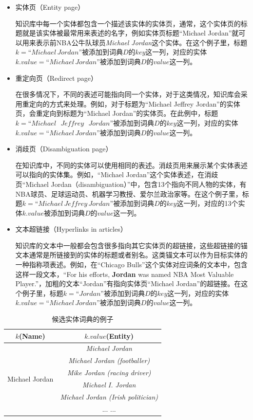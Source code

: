 \begin{itemize}
	\item {实体页（Entity page）
		
		知识库中每一个实体都包含一个描述该实体的实体页，通常，这个实体页的标题就是该实体被最常用来表述的名字，例如实体页标题“Michael Jordan”就可以用来表示前NBA公牛队球员\textit{Michael Jordan}这个实体。在这个例子里，标题$k=“Michael\, Jordan”$被添加到词典$D$的$key$这一列，对应的实体$k.value=“Michael\, Jordan”$被添加到词典$D$的$value$这一列。
		}
	\item {重定向页（Redirect page）
		
		在很多情况下，不同的表述可能指向同一个实体，对于这类情况，知识库会采用重定向的方式来处理。例如，对于标题为“Michael Jeffrey Jordan”的实体页，会重定向到标题为“Michael Jordan”的实体页。在此例中，标题$k=“Michael\text{\ }Jeffrey\text{\ }Jordan”$被添加到词典$D$的$key$这一列，对应的实体$k.value=“Michael\, Jordan”$被添加到词典$D$的$value$这一列。
	}
	\item {消歧页（Disambiguation page）
		
		在知识库中，不同的实体可以使用相同的表述。消歧页用来展示某个实体表述可以指向的实体集。例如，“Michael Jordan”这个实体表述，在消歧页“Michael Jordan（disambiguation）”中，包含13个指向不同人物的实体，有NBA球员、足球运动员、机器学习教授、爱尔兰政治家等。在这个例子里，标题$k=“Michael\, Jeffrey\, Jordan”$被添加到词典$D$的$key$这一列，对应的13个实体$k.value$被添加到词典$D$的$value$这一列。
	}
	\item {文本超链接（Hyperlinks in articles）
		
		知识库的文本中一般都会包含很多指向其它实体页的超链接，这些超链接的锚文本通常是所链接到的实体的标题或者别名。这类锚文本可以作为目标实体的一种指称项表述。例如，在“Chicago Bulls”这个实体对应词条的文本中，包含这样一段文本，“For his efforts, \textbf{Jordan} was named NBA Most Valuable Player.”，加粗的文本“Jordan”有指向实体页“Michael Jordan”的超链接。在这个例子里，标题$k=“Jordan”$被添加到词典$D$的$key$这一列，对应的实体$k.value=“Michael\, Jordan”$被添加到词典$D$的$value$这一列。
	}
\end{itemize}

\begin{table}[!htb]
	\caption{候选实体词典的例子\label{tab:candidate_dict_example}}
	\begin{center}
		\begin{tabular}{|c|c|}
			\hline
			$k$(Name) & $k.value$(Entity) \\ \hline
			\multirow{6}{*}{Michael Jordan} &  \textit{Michael Jordan}\\
			& \textit{Michael Jordan (footballer)} \\
			& \textit{Mike Jordan (racing driver) } \\
			& \textit{Michael I. Jordan} \\
			& \textit{Michael Jordan (Irish politician)} \\
			& ... ... \\
			\hline
		\end{tabular}
	\end{center}
\end{table}

